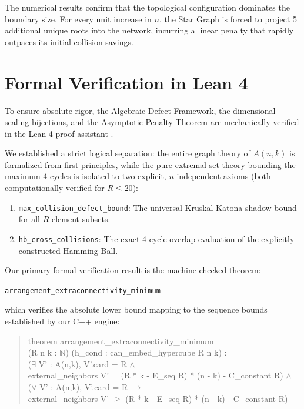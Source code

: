 \documentclass[11pt, letterpaper]{article}
\theoremstyle{definition}
\theoremstyle{remark}
\begin{document}
The numerical results confirm that the topological configuration dominates the boundary size. For every unit increase in $n$, the Star Graph is forced to project 5 additional unique roots into the network, incurring a linear penalty that rapidly outpaces its initial collision savings.

\section{Formal Verification in Lean 4}

To ensure absolute rigor, the Algebraic Defect Framework, the dimensional scaling bijections, and the Asymptotic Penalty Theorem are mechanically verified in the Lean 4 proof assistant \cite{leanprover}.

We established a strict logical separation: the entire graph theory of $A(n,k)$ is formalized from first principles, while the pure extremal set theory bounding the maximum 4-cycles is isolated to two explicit, $n$-independent axioms (both computationally verified for $R \le 20$):
\begin{enumerate}
    \item \texttt{max\_collision\_defect\_bound}: The universal Kruskal-Katona shadow bound for all $R$-element subsets.
    \item \texttt{hb\_cross\_collisions}: The exact 4-cycle overlap evaluation of the explicitly constructed Hamming Ball.
\end{enumerate}

Our primary formal verification result is the machine-checked theorem:
\begin{center}
  \texttt{arrangement\_extraconnectivity\_minimum}
\end{center}
which verifies the absolute lower bound mapping to the sequence bounds established by our C++ engine:

\begin{quote}
\small \ttfamily
theorem arrangement\_extraconnectivity\_minimum \\
(R n k : $\mathbb{N}$) (h\_cond : can\_embed\_hypercube R n k) : \\
($\exists$ V' : A(n,k), V'.card = R $\land$ \\
external\_neighbors V' = (R * k - E\_seq R) * (n - k) - C\_constant R) $\land$ \\
($\forall$ V' : A(n,k), V'.card = R $\to$ \\
external\_neighbors V' $\ge$ (R * k - E\_seq R) * (n - k) - C\_constant R)
\end{quote}
\end{document}
